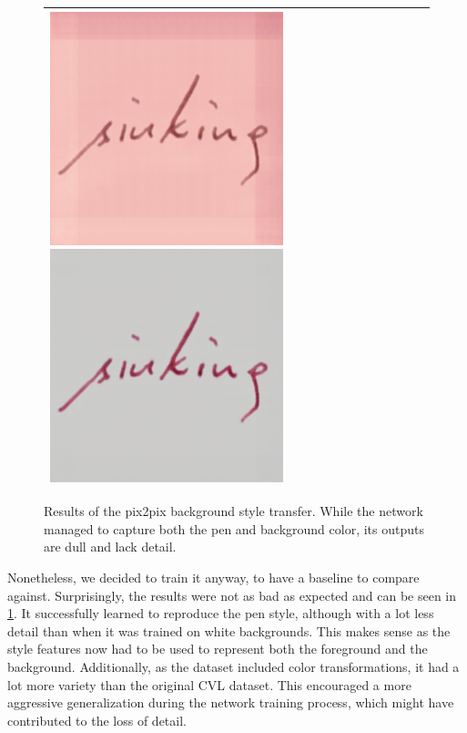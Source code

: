 \begin{figure}
\begin{tabular}{lc}
{  \includegraphics[scale=0.18]{../assets/background_style_transfer/spade/result_pix2pix/74.png}%
  \includegraphics[scale=0.18]{../assets/background_style_transfer/spade/result_pix2pix/99.png}%
  }
  \\
  \bottomrule
  \end{tabular}
  \caption[Results of the \gls{pix2pix} based background style transfer]{Results of the \gls{pix2pix} background style transfer. While the network managed to capture both the pen and background color, its outputs are dull and lack detail.}
  \label{fig:pix2pixBackgroundResults}
\end{figure}


Nonetheless, we decided to train it anyway, to have a baseline to compare against. Surprisingly, the results were not as bad as expected and can be seen in \cref{fig:pix2pixBackgroundResults}. It successfully learned to reproduce the pen style, although with a lot less detail than when it was trained on white backgrounds. This makes sense as the style features now had to be used to represent both the foreground and the background. Additionally, as the dataset included color transformations, it had a lot more variety than the original CVL dataset. This encouraged a more aggressive generalization during the network training process, which might have contributed to the loss of detail.

